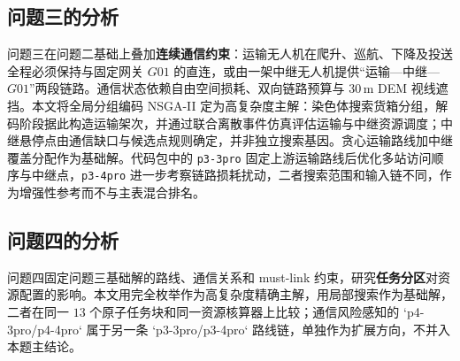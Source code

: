 \subsection{问题三的分析}

问题三在问题二基础上叠加\textbf{连续通信约束}：运输无人机在爬升、巡航、下降及投送全程必须保持与固定网关 $G01$ 的直连，或由一架中继无人机提供“运输—中继—$G01$”两段链路。通信状态依赖自由空间损耗、双向链路预算与 $30\,$m DEM 视线遮挡。本文将全局分组编码 NSGA-II 定为高复杂度主解：染色体搜索货箱分组，解码阶段据此构造运输架次，并通过联合离散事件仿真评估运输与中继资源调度；中继悬停点由通信缺口与候选点规则确定，并非独立搜索基因。贪心运输路线加中继覆盖分配作为基础解。代码包中的 \texttt{p3-3pro} 固定上游运输路线后优化多站访问顺序与中继点，\texttt{p3-4pro} 进一步考察链路损耗扰动，二者搜索范围和输入链不同，作为增强性参考而不与主表混合排名。

\subsection{问题四的分析}

问题四固定问题三基础解的路线、通信关系和 must-link 约束，研究\textbf{任务分区}对资源配置的影响。本文用完全枚举作为高复杂度精确主解，用局部搜索作为基础解，二者在同一 $13$ 个原子任务块和同一资源核算器上比较；通信风险感知的 `p4-3pro/p4-4pro` 属于另一条 `p3-3pro/p3-4pro` 路线链，单独作为扩展方向，不并入本题主结论。
